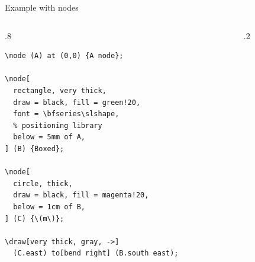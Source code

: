 \documentclass[aspectratio=169]{beamer}
\begin{document}
\begin{frame}[fragile]{Example with nodes}
  \begin{columns}
    \begin{column}{.8\linewidth}
      \begin{lstlisting}[basicstyle=\ttfamily\scriptsize]
\node (A) at (0,0) {A node};

\node[
  rectangle, very thick,
  draw = black, fill = green!20,
  font = \bfseries\slshape,
  % positioning library
  below = 5mm of A,
] (B) {Boxed};

\node[
  circle, thick,
  draw = black, fill = magenta!20,
  below = 1cm of B,
] (C) {\(m\)};

\draw[very thick, gray, ->]
  (C.east) to[bend right] (B.south east);\end{lstlisting}
    \end{column}
    \begin{column}{.2\linewidth}
      \centering
    \end{column}
  \end{columns}
\end{frame}
\end{document}
